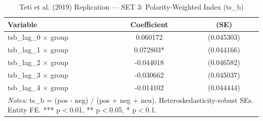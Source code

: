 \begin{table}[htbp]
\centering
\caption{Teti et al. (2019) Replication --- SET 3: Polarity-Weighted Index (ts\_b)}
\label{tab:teti_set3}
\begin{tabular}{lcc}
\hline\hline
Variable & Coefficient & (SE) \\
\hline
tsb\_lag\_0 $\times$ group & 0.060172 & (0.045303) \\
tsb\_lag\_1 $\times$ group & 0.072803* & (0.044166) \\
tsb\_lag\_2 $\times$ group & -0.044018 & (0.046582) \\
tsb\_lag\_3 $\times$ group & -0.030662 & (0.045037) \\
tsb\_lag\_4 $\times$ group & -0.014102 & (0.044444) \\
\hline\hline
\multicolumn{3}{l}{\footnotesize \textit{Notes:} ts_b = (pos - neg) / (pos + neg + neu). Heteroskedasticity-robust SEs. Entity FE. *** p$<$0.01, ** p$<$0.05, * p$<$0.1.} \\
\end{tabular}
\end{table}